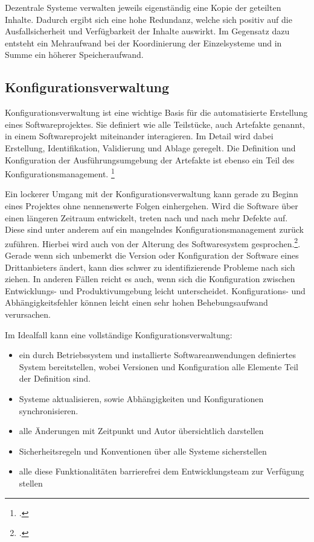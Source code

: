 Dezentrale Systeme verwalten jeweils eigenständig eine Kopie der geteilten Inhalte. Dadurch ergibt sich eine hohe Redundanz, welche sich positiv auf die Ausfallsicherheit und Verfügbarkeit der Inhalte auswirkt. Im Gegensatz dazu entsteht ein Mehraufwand bei der Koordinierung der Einzelsysteme und in Summe ein höherer Speicheraufwand.

\subsection{Konfigurationsverwaltung}
\label{subsec:konfigurationsverwaltung}

Konfigurationsverwaltung ist eine wichtige Basis für die automatisierte Erstellung eines Softwareprojektes. Sie definiert wie alle Teilstücke, auch Artefakte genannt, in einem Softwareprojekt miteinander interagieren. Im Detail wird dabei Erstellung, Identifikation, Validierung und Ablage geregelt. Die Definition und Konfiguration der Ausführungsumgebung der 
Artefakte ist ebenso ein Teil des Konfigurationsmanagement. \footcite[vgl.][]{humble2010}

Ein lockerer Umgang mit der Konfigurationsverwaltung kann gerade zu Beginn eines Projektes ohne nennenswerte Folgen einhergehen. Wird die Software über einen längeren Zeitraum entwickelt, treten nach und nach mehr Defekte auf. Diese sind unter anderem auf ein mangelndes Konfigurationsmanagement zurück zuführen. Hierbei wird auch von der Alterung des Softwaresystem gesprochen.\footcite[vgl.][]{software-quality2008}. Gerade wenn sich unbemerkt die Version oder Konfiguration der Software eines Drittanbieters ändert, kann dies schwer zu identifizierende Probleme nach sich ziehen. In anderen Fällen reicht es auch, wenn sich die Konfiguration zwischen Entwicklungs- und Produktivumgebung leicht unterscheidet. Konfigurations- und Abhängigkeitsfehler können leicht einen sehr hohen 
Behebungsaufwand verursachen.

Im Idealfall kann eine vollständige Konfigurationsverwaltung:
\begin{itemize}
\item ein durch Betriebssystem und installierte Softwareanwendungen definiertes System bereitstellen, wobei Versionen und Konfiguration alle Elemente Teil der Definition sind.
\item Systeme aktualisieren, sowie Abhängigkeiten und Konfigurationen synchronisieren.
\item alle Änderungen mit Zeitpunkt und Autor übersichtlich darstellen
\item Sicherheitsregeln und Konventionen über alle Systeme sicherstellen
\item alle diese Funktionalitäten barrierefrei dem Entwicklungsteam zur Verfügung stellen
\end{itemize}

